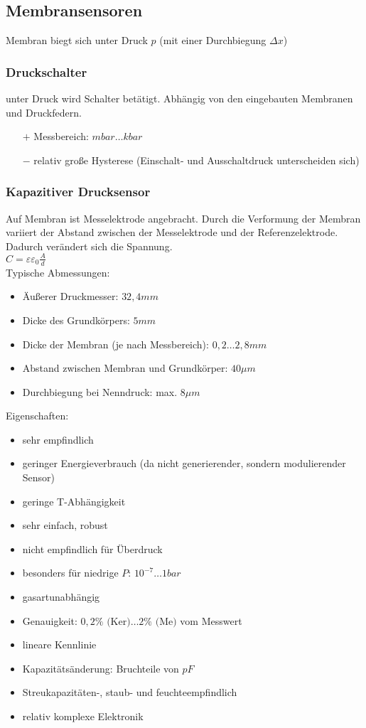 \documentclass{scrreprt}
\begin{document}
\subsection{Membransensoren}
Membran biegt sich unter Druck $p$ (mit einer Durchbiegung $\Delta x$)

\subsubsection{Druckschalter}
unter Druck wird Schalter betätigt. Abhängig von den eingebauten Membranen und Druckfedern.
\begin{itemize}
\item[$+$] Messbereich: $\unit{mbar}\dots\unit{kbar}$
\item[$-$] relativ große Hysterese (Einschalt- und Ausschaltdruck unterscheiden sich)
\end{itemize}
\subsubsection{Kapazitiver Drucksensor}
Auf Membran ist Messelektrode angebracht. Durch die Verformung der Membran variiert der Abstand zwischen der Messelektrode und der Referenzelektrode. Dadurch verändert sich die Spannung.\\
$C=\varepsilon\varepsilon_0\frac{A}{d}$\\
Typische Abmessungen:
\begin{itemize}
\item Äußerer Druckmesser: $32,4\unit{mm}$
\item Dicke des Grundkörpers: $5\unit{mm}$
\item Dicke der Membran (je nach Messbereich): $0,2\dots 2,8 \unit{mm}$
\item Abstand zwischen Membran und Grundkörper: $40\unit{\mu m}$
\item Durchbiegung bei Nenndruck: max. $8 \unit{\mu m}$
\end{itemize}
Eigenschaften:
\begin{itemize}[label=$+$]
\item sehr empfindlich
\item geringer Energieverbrauch (da nicht generierender, sondern modulierender Sensor)
\item geringe T-Abhängigkeit
\item sehr einfach, robust
\item nicht empfindlich für Überdruck
\item besonders für niedrige $\unit{P}$: $10^{-7}\dots 1 \unit{bar}$
\item gasartunabhängig
\item Genauigkeit: $0,2\%\text{ (Ker)}\dots2\%\text{ (Me)}$ vom Messwert
\item lineare Kennlinie
\end{itemize}
\begin{itemize}[label=$-$]
\item Kapazitätsänderung: Bruchteile von $\unit{pF}$
\item Streukapazitäten-, staub- und feuchteempfindlich
\item relativ komplexe Elektronik
\end{itemize}
\end{document}
